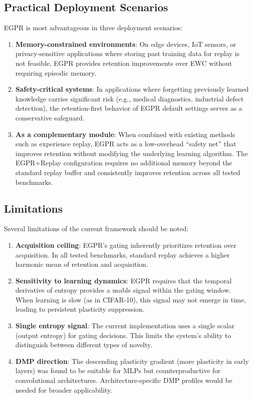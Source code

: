 \documentclass[11pt,a4paper]{article}
\begin{document}
\subsection{Practical Deployment Scenarios}

EGPR is most advantageous in three deployment scenarios:

\begin{enumerate}
    \item \textbf{Memory-constrained environments}: On edge devices, IoT sensors, or privacy-sensitive applications where storing past training data for replay is not feasible, EGPR provides retention improvements over EWC without requiring episodic memory.
    \item \textbf{Safety-critical systems}: In applications where forgetting previously learned knowledge carries significant risk (e.g., medical diagnostics, industrial defect detection), the retention-first behavior of EGPR default settings serves as a conservative safeguard.
    \item \textbf{As a complementary module}: When combined with existing methods such as experience replay, EGPR acts as a low-overhead ``safety net'' that improves retention without modifying the underlying learning algorithm. The EGPR+Replay configuration requires no additional memory beyond the standard replay buffer and consistently improves retention across all tested benchmarks.
\end{enumerate}

\subsection{Limitations}

Several limitations of the current framework should be noted:

\begin{enumerate}
    \item \textbf{Acquisition ceiling}: EGPR's gating inherently prioritizes retention over acquisition. In all tested benchmarks, standard replay achieves a higher harmonic mean of retention and acquisition.
    \item \textbf{Sensitivity to learning dynamics}: EGPR requires that the temporal derivative of entropy provides a usable signal within the gating window. When learning is slow (as in CIFAR-10), this signal may not emerge in time, leading to persistent plasticity suppression.
    \item \textbf{Single entropy signal}: The current implementation uses a single scalar (output entropy) for gating decisions. This limits the system's ability to distinguish between different types of novelty.
    \item \textbf{DMP direction}: The descending plasticity gradient (more plasticity in early layers) was found to be suitable for MLPs but counterproductive for convolutional architectures. Architecture-specific DMP profiles would be needed for broader applicability.
\end{enumerate}
\end{document}
